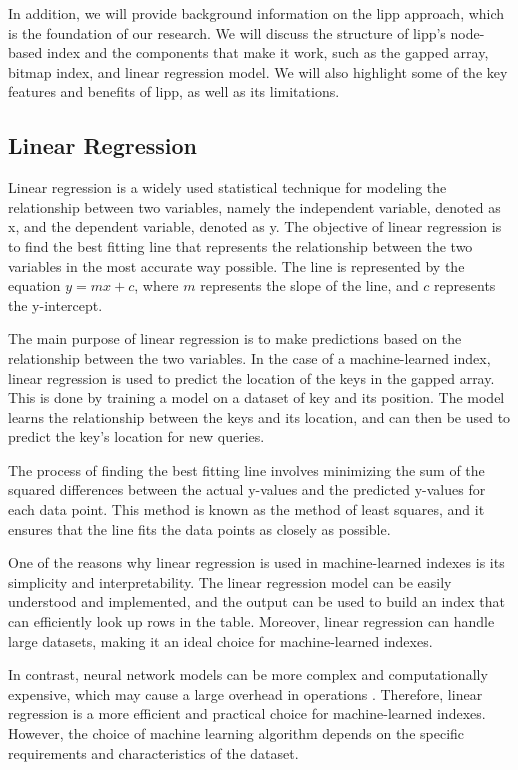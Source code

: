\documentclass[11pt,a4paper]{article}
\begin{document}
In addition, we will provide background information on the \acrshort{lipp} approach, which is the foundation of our research. We will discuss the structure of \acrshort{lipp}'s node-based index and the components that make it work, such as the gapped array, bitmap index, and linear regression model. We will also highlight some of the key features and benefits of \acrshort{lipp}, as well as its limitations.

\subsection{Linear Regression}
Linear regression is a widely used statistical technique for modeling the relationship between two variables, namely the independent variable, denoted as x, and the dependent variable, denoted as y. The objective of linear regression is to find the best fitting line that represents the relationship between the two variables in the most accurate way possible. The line is represented by the equation $y = mx + c$, where $m$ represents the slope of the line, and $c$ represents the y-intercept.

The main purpose of linear regression is to make predictions based on the relationship between the two variables. In the case of a machine-learned index, linear regression is used to predict the location of the keys in the gapped array. This is done by training a model on a dataset of key and its position. The model learns the relationship between the keys and its location, and can then be used to predict the key's location for new queries.

The process of finding the best fitting line involves minimizing the sum of the squared differences between the actual y-values and the predicted y-values for each data point. This method is known as the method of least squares, and it ensures that the line fits the data points as closely as possible.

One of the reasons why linear regression is used in machine-learned indexes is its simplicity and interpretability. The linear regression model can be easily understood and implemented, and the output can be used to build an index that can efficiently look up rows in the table. Moreover, linear regression can handle large datasets, making it an ideal choice for machine-learned indexes.

In contrast, neural network models can be more complex and computationally expensive, which may cause a large overhead in operations \cite{CasedLearnedIndex}. Therefore, linear regression is a more efficient and practical choice for machine-learned indexes. However, the choice of machine learning algorithm depends on the specific requirements and characteristics of the dataset.
\end{document}

